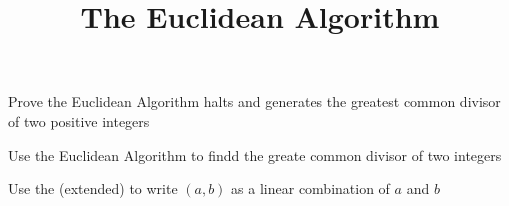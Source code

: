 \documentclass{ximera}
\title{The Euclidean Algorithm}
\begin{document}
\begin{abstract}
\end{abstract}
\maketitle


\begin{obj}
	\item Prove the Euclidean Algorithm halts and generates the greatest common divisor of two positive integers
	\item Use the Euclidean Algorithm to findd the greate common divisor of two integers
	\item  Use the (extended)  to write $(a,b)$ as a linear combination of $a$ and $b$
\end{obj}





		
\end{document}
